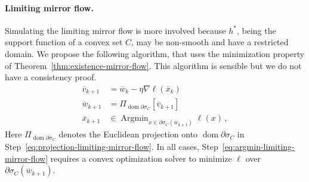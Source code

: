 \documentclass[11pt,english,reqno]{article}
\DeclareMathOperator{\dom}{dom}
\DeclareMathOperator{\Argmin}{Argmin}
\theoremstyle{plain}
\theoremstyle{definition}
\theoremstyle{remark}
\numberwithin{equation}{section}
\begin{document}
\paragraph*{Limiting mirror flow.} Simulating the limiting mirror flow is more involved because $h^*$, being the support function of a convex set $C$, may be non-smooth and have a restricted domain. We propose the following algorithm, that uses the minimization property of Theorem~\ref{thm:existence-mirror-flow}. This algorithm is sensible but we do not have a consistency proof. 
%
\begin{align}
	\overline{v}_{k+1} &= \overline{w}_k - \eta \nabla \ell(\overline{x}_k)\nonumber\\
	\label{eq:projection-limiting-mirror-flow}
	\overline{w}_{k+1} &= \Pi_{\dom \partial \sigma_C}\left[\overline{v}_{k+1}\right] \\
	\label{eq:argmin-limiting-mirror-flow}
	\overline{x}_{k+1} &\in \Argmin_{x \in \partial \sigma_C(\overline{w}_{k+1})} \ell(x)\, ,
\end{align}
Here $\Pi_{\dom \partial \sigma_C}$ denotes the Euclidean projection onto $\dom \partial \sigma_C$ in Step~\eqref{eq:projection-limiting-mirror-flow}. In all cases, Step~\eqref{eq:argmin-limiting-mirror-flow} requires a convex optimization solver to minimize $\ell$ over $\partial \sigma_C(\overline{w}_{k+1})$.
\end{document}
